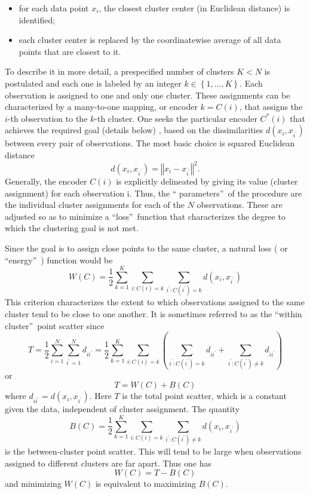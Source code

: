 \documentclass[11pt,twoside]{article}%
\theoremstyle{change}
\begin{document}
\begin{itemize}
\item for each data point $x_{i}$, the closest cluster center (in Euclidean
distance) is identified;

\item each cluster center is replaced by the coordinatewise average of all
data points that are closest to it.
\end{itemize}

To describe it in more detail, a prespecified number of clusters $K<N$ is
postulated and each one is labeled by an integer $k\in\left\{  1,\ldots
,K\right\}  $. Each observation is assigned to one and only one cluster. These
assignments can be characterized by a many-to-one mapping, or encoder
$k=C(i)$, that assigns the $i$-th observation to the $k$-th cluster. One seeks
the particular encoder $C^{\ast}(i)$ that achieves the required goal (details
below) , based on the dissimilarities $d(x_{i},x_{i^{\prime}})$ between every
pair of observations. The most basic choice is squared Euclidean distance
\[
d(x_{i},x_{i^{\prime}})=\left\Vert x_{i}-x_{i^{\prime}}\right\Vert ^{2}.
\]
Generally, the encoder $C(i)$ is explicitly delineated by giving its value
(cluster assignment) for each observation i. Thus, the \textquotedblleft
parameters\textquotedblright\ of the procedure are the individual cluster
assignments for each of the $N$ observations. These are adjusted so as to
minimize a \textquotedblleft loss\textquotedblright\ function that
characterizes the degree to which the clustering goal is not met.

Since the goal is to assign close points to the same cluster, a natural loss (
or \textquotedblleft energy\textquotedblright\ ) function would be%
\begin{equation}
W(C)=\frac{1}{2}\sum_{k=1}^{K}\sum_{i:C(i)=k}\sum_{i^{\prime}:C(i^{\prime}%
)=k}d(x_{i},x_{i^{\prime}})\label{within-point-scatter}%
\end{equation}
This criterion characterizes the extent to which observations assigned to the
same cluster tend to be close to one another. It is sometimes referred to as
the \textquotedblleft within cluster\textquotedblright\ point scatter since%
\[
T=\frac{1}{2}\sum_{i=1}^{N}\sum_{i^{\prime}=1}^{N}d_{ii^{\prime}}=\frac{1}%
{2}\sum_{k=1}^{K}\sum_{i:C(i)=k}\left(  \sum_{i^{\prime}:C(i^{\prime}%
)=k}d_{ii^{\prime}}+\sum_{i^{\prime}:C(i^{\prime})\neq k}d_{ii^{\prime}%
}\right)
\]
or
\[
T=W(C)+B(C)
\]
where $d_{ii^{\prime}}=d(x_{i},x_{i^{\prime}})$. Here $T$ is the total point
scatter, which is a constant given the data, independent of cluster
assignment. The quantity%
\[
B(C)=\frac{1}{2}\sum_{k=1}^{K}\sum_{i:C(i)=k}\sum_{i^{\prime}:C(i^{\prime
})\neq k}d(x_{i},x_{i^{\prime}})
\]
is the between-cluster point scatter. This will tend to be large when
observations assigned to different clusters are far apart. Thus one has%
\[
W(C)=T-B(C)
\]
and minimizing $W(C)$ is equivalent to maximizing $B(C)$.
\end{document}
